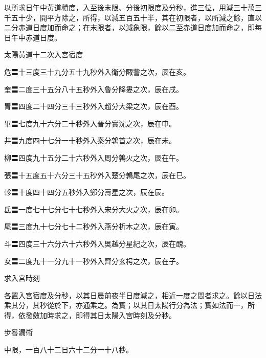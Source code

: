 \begin{pinyinscope}
 以所求日午中黃道積度，入至後末限、分後初限度及分秒，進三位，用減三十萬三千五十少，開平方除之，所得，以減五百五十半，其在初限者，以所減之餘，直以二分赤道日度加而命之；在末限者，以減象限，餘以二至赤道日度加而命之，即每日午中赤道日度。



 太陽黃道十二次入宮宿度



 危〓十三度三十九分五十九秒外入衛分陬訾之次，辰在亥。



 奎〓二度三十五分八十五秒外入魯分降婁之次，辰在戌。



 胃〓四度二十四分三十三秒外入趙分大梁之次，辰在酉。



 畢〓七度九十六分二十秒外入晉分實沈之次，辰在申。



 井〓九度四十七分一十秒外入秦分鶉首之次，辰在未。



 柳〓四度九十五分二十六秒外入周分鶉火之次，辰在午。



 張〓十五度五十六分三十五秒外入楚分鶉尾之次，辰在巳。



 軫〓十度四十四分五秒外入鄭分壽星之次，辰在辰。



 氐〓一度七十七分七十七秒外入宋分大火之次，辰在卯。



 尾〓三度九十七分七十二秒外入燕分析木之次，辰在寅。



 斗〓四度三十六分六十六秒外入吳越分星紀之次，辰在醜。



 女〓二度九十一分九十一秒外入齊分玄枵之次，辰在子。



 求入宮時刻



 各置入宮宿度及分秒，以其日晨前夜半日度減之，相近一度之間者求之。餘以日法乘其分，其秒從於下，亦通乘之。為實；以其日太陽行分為法；實如法而一，所得，依發斂加時求之，即得其日太陽入宮時刻及分秒。



 步晷漏術



 中限，一百八十二日六十二分一十八秒。




\end{pinyinscope}
